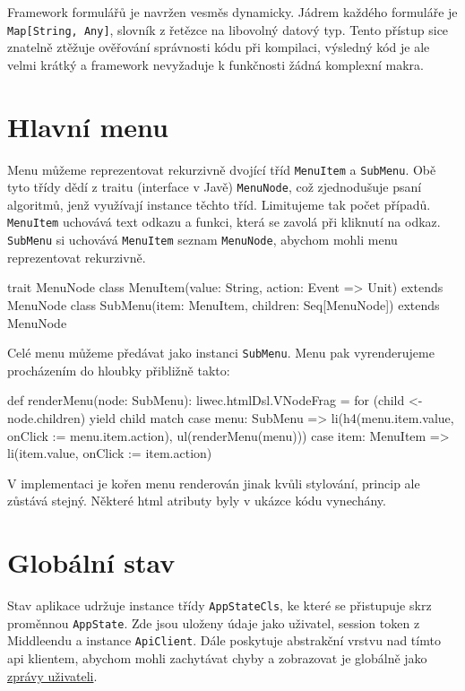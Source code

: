 Framework formulářů je navržen vesměs dynamicky. Jádrem každého formuláře je
\texttt{Map[String, Any]}, slovník z řetězce na libovolný datový typ. Tento
přístup sice znatelně ztěžuje ověřování správnosti kódu při kompilaci, výsledný
kód je ale velmi krátký a framework nevyžaduje k funkčnosti žádná komplexní
makra.

\section{Hlavní menu}

Menu můžeme reprezentovat rekurzivně dvojící tříd \verb|MenuItem|
a \verb|SubMenu|. Obě tyto třídy dědí z traitu (interface v Javě) \verb|MenuNode|,
což zjednodušuje psaní algoritmů, jenž využívají instance
těchto tříd. Limitujeme tak počet případů.
\verb|MenuItem| uchovává text odkazu a funkci, která se zavolá
při kliknutí na odkaz.
\verb|SubMenu| si uchovává \verb|MenuItem|
seznam \verb|MenuNode|, abychom mohli menu reprezentovat rekurzivně.

\begin{code}
trait MenuNode
class MenuItem(value: String, action: Event => Unit) extends MenuNode
class SubMenu(item: MenuItem, children: Seq[MenuNode]) extends MenuNode
\end{code}

Celé menu můžeme předávat jako instanci \verb|SubMenu|.
Menu pak vyrenderujeme procházením do hloubky přibližně takto:

\begin{code}
def renderMenu(node: SubMenu): liwec.htmlDsl.VNodeFrag =
    for (child <- node.children) yield child match {
        case menu: SubMenu => 
            li(h4(menu.item.value, onClick := menu.item.action),
                ul(renderMenu(menu)))
        case item: MenuItem => 
            li(item.value, onClick := item.action)
    }
\end{code}

V implementaci je kořen menu renderován jinak kvůli stylování,
princip ale zůstává stejný. Některé html atributy byly v ukázce kódu vynechány.

\section{Globální stav}

Stav aplikace udržuje instance třídy \verb|AppStateCls|, ke které se přistupuje skrz
proměnnou \verb|AppState|. Zde jsou uloženy údaje jako uživatel, session token z
Middleendu a instance \verb|ApiClient|. Dále poskytuje abstrakční vrstvu nad tímto api klientem,
abychom mohli zachytávat chyby a zobrazovat je globálně jako \hyperref[userMessages]{zprávy uživateli}.

